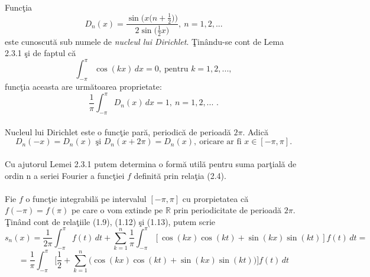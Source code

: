 \documentclass[a4paper,openany,12pt]{report}
\begin{document}
\paragraph*{}Func\c tia 
\begin{equation*}
D_n(x) =  \frac{\sin\Big(x\big(n + \frac{1}{2}\big)\Big)}{2\sin\big(\frac{1}{2}x\big)},\: n=1, 2, ...
\end{equation*}
este cunoscut\u a sub numele de \textit{nucleul lui Dirichlet}. \c Tin\^ andu-se cont de Lema 2.3.1 \c si de faptul c\u a
\begin{equation*} \int_{-\pi}^{\pi}\cos(kx)\, dx = 0,\:\text{pentru }k=1, 2, ..., 
\end{equation*}
func\c tia aceasta are urm\u atoarea proprietate:
\begin{equation}
\frac{1}{\pi}\int_{-\pi}^{\pi} D_n(x)\, dx = 1,\: n = 1, 2, ...\text{ .} 
\end{equation}
\paragraph*{}Nucleul lui Dirichlet este o func\c tie par\u a, periodic\u a de perioad\u a $2\pi.$ Adic\u a
\begin{equation*}
D_n(-x) = D_n(x) \text{ \c si } D_n(x+2\pi) = D_n(x),\:\text{oricare ar fi } x \in [-\pi, \pi].
\end{equation*}
\paragraph*{}Cu ajutorul Lemei 2.3.1 putem determina o form\u a util\u a pentru suma par\c tial\u a de ordin n a seriei Fourier a func\c tiei $f$ definit\u a prin rela\c tia (2.4). 
\paragraph*{}Fie $f$ o func\c tie integrabil\u a pe intervalul $[-\pi, \pi]$ cu prorpietatea c\u a $f(-\pi) = f(\pi)$ pe care o vom extinde pe $\mathbb{R}$ prin periodicitate de perioad\u a $2\pi$. \c Tin\^ and cont de rela\c tiile (1.9), (1.12) \c si (1.13), putem scrie
\begin{equation*}
s_n(x) = \frac{1}{2\pi}\int_{-\pi}^{\pi}f(t)\,dt+ \sum_{k=1}^{n}\frac{1}{\pi}\int_{-\pi}^{\pi}[\cos(kx)\cos(kt)+\sin(kx)\sin(kt)]f(t)\, dt = 
\end{equation*}
\begin{equation*}
= \frac{1}{\pi}\int_{-\pi}^{\pi}\bigg[\frac{1}{2} + \sum_{k=1}^{n}\big( \cos(kx)\cos(kt)+\sin(kx)\sin(kt)\big)\bigg]f(t)\, dt 
\end{equation*}
\end{document}
